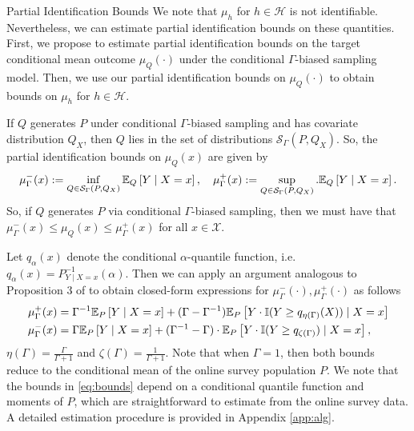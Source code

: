 \begin{subsection}{Partial Identification Bounds}
We note that $\mu_{h}$ for $h \in \mathcal{H}$ is not identifiable. Nevertheless, we can estimate partial identification bounds on these quantities. First, we propose to estimate partial identification bounds on the target conditional mean outcome $\mu_{Q}(\cdot)$ under the conditional $\Gamma$-biased sampling model. Then, we use our partial identification bounds on $\mu_{Q}(\cdot)$ to obtain bounds on $\mu_{h}$ for $h \in \mathcal{H}.$

 If $Q$ generates $P$ under conditional $\Gamma$-biased sampling and has covariate distribution $Q_{X}$, then $Q$ lies in the set of distributions $\mathcal{S}_{\Gamma}(P, Q_{X}).$ So, the partial identification bounds on $\mu_{Q}(x)$ are given by 
\begin{equation}
\label{eq:def_bound}
\mu_{\Gamma}^{-}(x):= \inf_{Q \in \mathcal{S}_{\Gamma}(P, Q_{X})} \EE[Q]{Y \mid X=x}, \quad  \mu_{\Gamma}^{+}(x):= \sup_{Q \in \mathcal{S}_{\Gamma}(P, Q_{X})}. \EE[Q]{Y \mid X=x}.
\end{equation}
So, if $Q$ generates $P$ via conditional $\Gamma$-biased sampling, then we must have that $\mu_{\Gamma}^{-}(x) \leq \mu_{Q}(x) \leq \mu_{\Gamma}^{+}(x)$ for all $x \in \mathcal{X}.$

Let $q_{\alpha}(x)$ denote the conditional $\alpha$-quantile function, i.e. $q_{\alpha}(x) = P_{Y \mid X=x}^{-1}(\alpha).$ Then we can apply an argument analogous to Proposition 3 of \citet{dorn2024doubly} to obtain closed-form expressions for $\mu_{\Gamma}^{-}(\cdot), \mu_{\Gamma}^{+}(\cdot)$ as follows
\begin{equation}
\label{eq:bounds}
\begin{split}
\mu_{\Gamma}^{+}(x) &= \Gamma^{-1}\EE[P]{Y \mid X=x} + (\Gamma - \Gamma^{-1}) \EE[P]{Y \cdot \mathbb{I}(Y \geq q_{\eta(\Gamma)}(X)) \mid X=x}\\
\mu_{\Gamma}^{-}(x) &= \Gamma \EE[P]{Y \mid X=x} + (\Gamma^{-1} - \Gamma) \cdot \EE[P]{Y \cdot \mathbb{I}(Y \geq q_{\zeta(\Gamma)}) \mid X=x},
\end{split}
\end{equation}
 $\eta(\Gamma) = \frac{\Gamma}{\Gamma + 1}$ and $\zeta(\Gamma) = \frac{1}{\Gamma + 1}.$ Note that when $\Gamma = 1$, then both bounds reduce to the conditional mean of the online survey population $P$. We note that the bounds in \eqref{eq:bounds} depend on a conditional quantile function and moments of $P$, which are straightforward to estimate from the online survey data. A detailed estimation procedure is provided in Appendix \ref{app:alg}.


\end{subsection}
